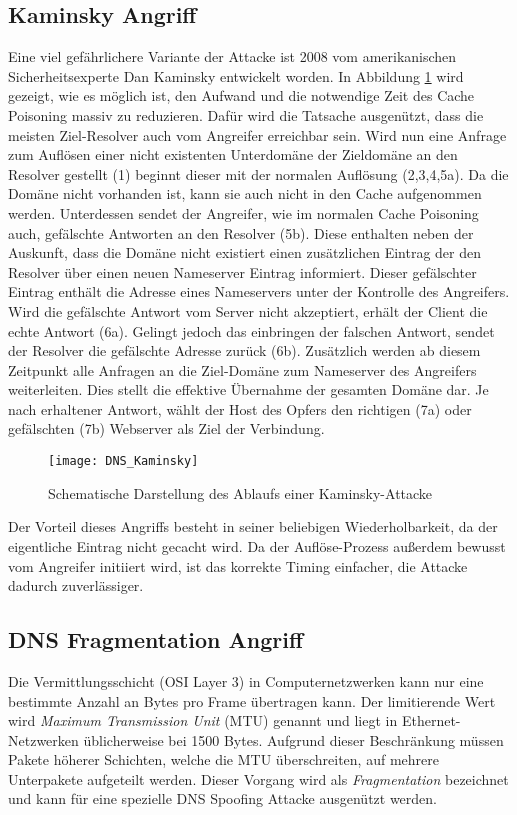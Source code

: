 \subsection{Kaminsky Angriff}
Eine viel gefährlichere Variante der Attacke ist 2008 vom amerikanischen Sicherheitsexperte Dan Kaminsky entwickelt worden\cite{Son2010}. In Abbildung \ref{img:dnskaminsky} wird gezeigt, wie es möglich ist, den Aufwand und die notwendige Zeit des Cache Poisoning massiv zu reduzieren. Dafür wird die Tatsache ausgenützt, dass die meisten Ziel-Resolver auch vom Angreifer erreichbar sein. Wird nun eine Anfrage zum Auflösen einer nicht existenten Unterdomäne der Zieldomäne an den Resolver gestellt (1) beginnt dieser mit der normalen Auflösung (2,3,4,5a). Da die Domäne nicht vorhanden ist, kann sie auch nicht in den Cache aufgenommen werden. Unterdessen sendet der Angreifer, wie im normalen Cache Poisoning auch, gefälschte Antworten an den Resolver (5b). Diese enthalten neben der Auskunft, dass die Domäne nicht existiert einen zusätzlichen Eintrag der den Resolver über einen neuen Nameserver Eintrag informiert. Dieser gefälschter Eintrag enthält die Adresse eines Nameservers unter der Kontrolle des Angreifers. Wird die gefälschte Antwort vom Server nicht akzeptiert, erhält der Client die echte Antwort (6a). Gelingt jedoch das einbringen der falschen Antwort, sendet der Resolver die gefälschte Adresse zurück (6b). Zusätzlich werden ab diesem Zeitpunkt alle Anfragen an die Ziel-Domäne zum Nameserver des Angreifers weiterleiten. Dies stellt die effektive Übernahme der gesamten Domäne dar. Je nach erhaltener Antwort, wählt der Host des Opfers den richtigen (7a) oder gefälschten (7b) Webserver als Ziel der Verbindung.

\begin{figure}[!hb]
    \centering
    \texttt{[image: DNS\_Kaminsky]}
    \caption{Schematische Darstellung des Ablaufs einer Kaminsky-Attacke}
    \label{img:dnskaminsky}
\end{figure}

Der Vorteil dieses Angriffs besteht in seiner beliebigen Wiederholbarkeit, da der eigentliche Eintrag nicht gecacht wird. Da der Auflöse-Prozess außerdem bewusst vom Angreifer initiiert wird, ist das korrekte Timing einfacher, die Attacke dadurch zuverlässiger.

\subsection{DNS Fragmentation Angriff}
Die Vermittlungsschicht (OSI Layer 3) in Computernetzwerken kann nur eine bestimmte Anzahl an Bytes pro Frame übertragen kann. Der limitierende Wert wird \textit{Maximum Transmission Unit} (MTU) genannt und liegt in Ethernet-Netzwerken üblicherweise bei 1500 Bytes. Aufgrund dieser Beschränkung müssen Pakete höherer Schichten, welche die MTU überschreiten, auf mehrere Unterpakete aufgeteilt werden. Dieser Vorgang wird als \textit{Fragmentation} bezeichnet und kann für eine spezielle DNS Spoofing Attacke ausgenützt werden.

